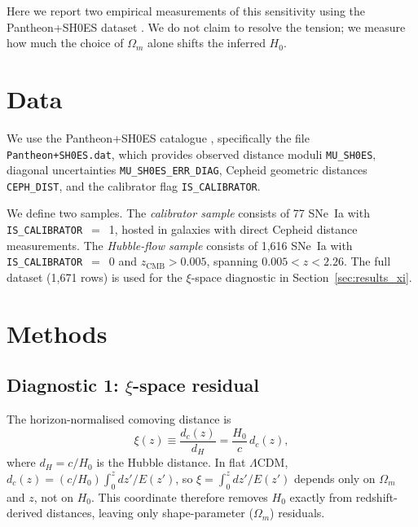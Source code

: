 \documentclass[usenatbib]{mnras}
\begin{document}
Here we report two empirical measurements of this sensitivity using the
Pantheon+SH0ES dataset \citep{scolnic2022,brout2022}.
We do not claim to resolve the tension; we measure how much the
choice of $\Omega_m$ alone shifts the inferred $H_0$.

\section{Data}
\label{sec:data}

We use the Pantheon+SH0ES catalogue \citep{scolnic2022,brout2022},
specifically the file \texttt{Pantheon+SH0ES.dat}, which provides
observed distance moduli \texttt{MU\_SH0ES}, diagonal uncertainties
\texttt{MU\_SH0ES\_ERR\_DIAG}, Cepheid geometric distances
\texttt{CEPH\_DIST}, and the calibrator flag \texttt{IS\_CALIBRATOR}.

We define two samples.
The \emph{calibrator sample} consists of 77 SNe~Ia with
\texttt{IS\_CALIBRATOR}~$=$~1, hosted in galaxies with direct Cepheid
distance measurements.
The \emph{Hubble-flow sample} consists of 1{,}616 SNe~Ia with
\texttt{IS\_CALIBRATOR}~$=$~0 and $z_\mathrm{CMB} > 0.005$,
spanning $0.005 < z < 2.26$.
The full dataset (1{,}671 rows) is used for the $\xi$-space diagnostic
in Section~\ref{sec:results_xi}.

\section{Methods}
\label{sec:methods}

\subsection{Diagnostic 1: $\xi$-space residual}
\label{sec:xi}

The horizon-normalised comoving distance is
\begin{equation}
  \xi(z) \equiv \frac{d_c(z)}{d_H} = \frac{H_0}{c}\,d_c(z),
  \label{eq:xi}
\end{equation}
where $d_H = c/H_0$ is the Hubble distance.
In flat $\Lambda$CDM,
$d_c(z) = (c/H_0)\int_0^z dz'/E(z')$, so $\xi = \int_0^z dz'/E(z')$
depends only on $\Omega_m$ and $z$, not on $H_0$.
This coordinate therefore removes $H_0$ exactly from redshift-derived
distances, leaving only shape-parameter ($\Omega_m$) residuals.
\end{document}
